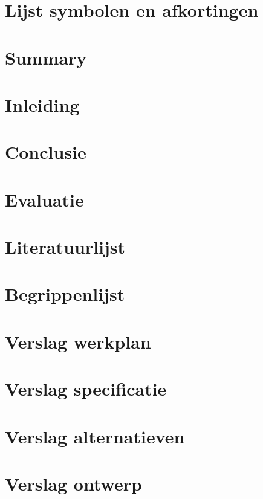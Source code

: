 \documentclass[a4paper,11pt, twoside]{article}
\begin{document}
	

	\tableofcontents
	\newpage

	\section{Lijst symbolen en afkortingen}
    \newpage

    \section{Summary}

    \section{Inleiding}
    

    
    
    
    

    \section{Conclusie}

    \section{Evaluatie}

    \section{Literatuurlijst}

    \newpage
    \appendix
    \section{Begrippenlijst}
    \section{Verslag werkplan}
    \section{Verslag specificatie}
    \section{Verslag alternatieven}    
    \section{Verslag ontwerp}
\end{document}
